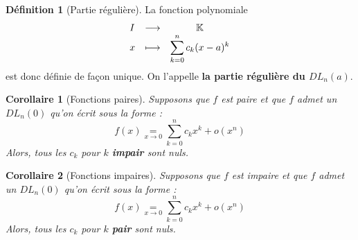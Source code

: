 \documentclass[french]{book}
\newcommand{\K}{\mathbb{K}}
\theoremstyle{plain}
\newtheorem{cor}{Corollaire}[chapter]
\theoremstyle{definition}
\newtheorem{dfn}{Définition}[chapter]
\theoremstyle{remark}
\begin{document}
\begin{dfn}[Partie régulière]
	La fonction polynomiale $$
	\begin{array}[t]{lrcl}
		I & \longrightarrow & \K \\
		x & \longmapsto & \displaystyle \sum_{k=0}^{n}c_k(x-a)^k
	\end{array}$$ est donc définie de façon unique. On l'appelle \textbf{la partie régulière du $DL_n(a)$}.
\end{dfn}
\begin{cor}[Fonctions paires]
	Supposons que $f$ est paire et que $f$ admet un $DL_n(0)$ qu'on écrit sous la forme : $$f(x)\underset{x\to 0}{=}\sum_{k=0}^{n}c_kx^k+o\left(x^n\right)$$ Alors, tous les $c_k$ pour $k$ \textbf{impair} sont nuls.
\end{cor}
\begin{cor}[Fonctions impaires]
	Supposons que $f$ est impaire et que $f$ admet un $DL_n(0)$ qu'on écrit sous la forme : $$f(x)\underset{x\to 0}{=}\sum_{k=0}^{n}c_kx^k+o\left(x^n\right)$$ Alors, tous les $c_k$ pour $k$ \textbf{pair} sont nuls.
\end{cor}
\end{document}
